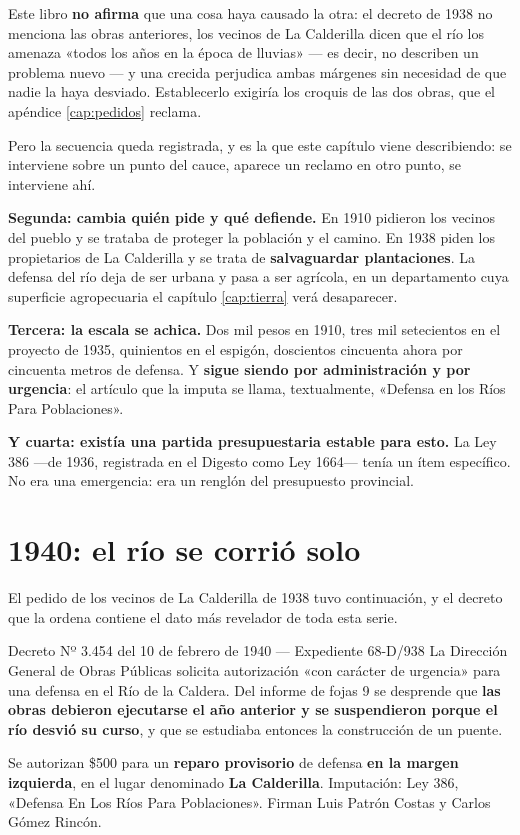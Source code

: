 Este libro \textbf{no afirma} que una cosa haya causado la otra: el decreto de 1938 no
menciona las obras anteriores, los vecinos de La Calderilla dicen que el río los amenaza
«todos los años en la época de lluvias» --- es decir, no describen un problema nuevo --- y una
crecida perjudica ambas márgenes sin necesidad de que nadie la haya desviado. Establecerlo
exigiría los croquis de las dos obras, que el apéndice \ref{cap:pedidos} reclama.

Pero la secuencia queda registrada, y es la que este capítulo viene describiendo: se
interviene sobre un punto del cauce, aparece un reclamo en otro punto, se interviene ahí.

\textbf{Segunda: cambia quién pide y qué defiende.} En 1910 pidieron los vecinos del pueblo
y se trataba de proteger la población y el camino. En 1938 piden los propietarios de La
Calderilla y se trata de \textbf{salvaguardar plantaciones}. La defensa del río deja de ser
urbana y pasa a ser agrícola, en un departamento cuya superficie agropecuaria el capítulo \ref{cap:tierra}
verá desaparecer.

\textbf{Tercera: la escala se achica.} Dos mil pesos en 1910, tres mil setecientos en el
proyecto de 1935, quinientos en el espigón, doscientos cincuenta ahora por cincuenta metros
de defensa. Y \textbf{sigue siendo por administración y por urgencia}: el artículo que la
imputa se llama, textualmente, «Defensa en los Ríos Para Poblaciones».

\textbf{Y cuarta: existía una partida presupuestaria estable para esto.} La Ley 386 ---de 1936, registrada en el Digesto como Ley 1664--- tenía un ítem específico. No era una emergencia: era un renglón del presupuesto provincial.

\section{1940: el río se corrió solo}

El pedido de los vecinos de La Calderilla de 1938 tuvo continuación, y el decreto que la
ordena contiene el dato más revelador de toda esta serie.

\begin{ficha}{Decreto Nº 3.454 del 10 de febrero de 1940 --- Expediente 68-D/938}
La Dirección General de Obras Públicas solicita autorización «con carácter de urgencia» para
una defensa en el Río de la Caldera. Del informe de fojas 9 se desprende que \textbf{las obras
debieron ejecutarse el año anterior y se suspendieron porque el río desvió su curso}, y que
se estudiaba entonces la construcción de un puente.

Se autorizan \$500 para un \textbf{reparo provisorio} de defensa \textbf{en la margen
izquierda}, en el lugar denominado \textbf{La Calderilla}. Imputación: Ley 386, «Defensa En
Los Ríos Para Poblaciones». Firman Luis Patrón Costas y Carlos Gómez Rincón.
\end{ficha}

